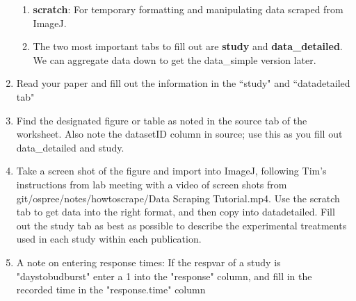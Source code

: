 \documentclass{article}\usepackage[]{graphicx}\usepackage[]{color}
\begin{document}
\begin{enumerate}
\begin{enumerate}
  \item \textbf{scratch}: For temporary formatting and manipulating data scraped from ImageJ.
  \item The two most important tabs to fill out are \textbf{study} and \textbf{data\_detailed}. We can aggregate data down to get the data\_simple version later.
  \end{enumerate}
\item Read your paper and fill out the information in the ``study" and ``data\textunderscore detailed tab"
\item Find the designated figure or table as noted in the source tab of the worksheet. Also note the datasetID column in source; use this as you fill out data\_detailed and study.
\item Take a screen shot of the figure and import into ImageJ, following Tim's instructions from lab meeting with a video of screen shots from git/ospree/notes/howtoscrape/Data Scraping Tutorial.mp4. Use the scratch tab to get data into the right format, and then copy into data\textunderscore detailed. Fill out the study tab as best as possible to describe the experimental treatments used in each study within each publication.
\item A note on entering response times: If the respvar of a study is "daystobudburst" enter a 1 into the "response" column, and fill in the recorded time in the "response.time" column
\end{enumerate}
\end{document}
